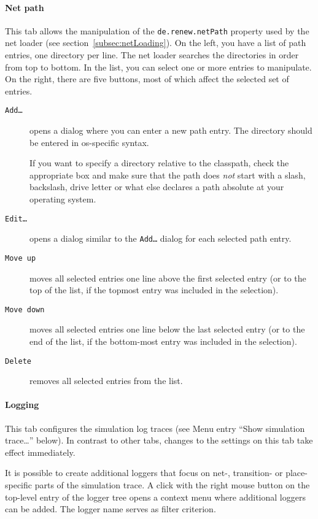 \paragraph{Net path}
This tab allows the manipulation of the \texttt{de.renew.netPath}
property used by the net loader (see
section~\ref{subsec:netLoading}).
On the left, you have a list of path entries, one directory per
line.
The net loader searches the directories in order from top to
bottom.
In the list, you can select one or more entries to manipulate.
On the right, there are five buttons, most of which affect the
selected set of entries.
\begin{description}
\item[\texttt{Add\dots}] opens a dialog where you can enter a new
  path entry.
  The directory should be entered in os-specific syntax.

  If you want to specify a directory relative to the classpath,
  check the appropriate box and make sure that the path does
  \emph{not} start with a slash, backslash, drive letter or what
  else declares a path absolute at your operating system.
\item[\texttt{Edit\dots}] opens a dialog similar to the
  \texttt{Add\dots} dialog for each selected path entry.
\item[\texttt{Move up}] moves all selected entries one line above
  the first selected entry (or to the top of the list, if the
  topmost entry was included in the selection).
\item[\texttt{Move down}] moves all selected entries one line below
  the last selected entry (or to the end of the list, if the
  bottom-most entry was included in the selection).
\item[\texttt{Delete}] removes all selected entries from the list.
\end{description}

\paragraph{Logging}
This tab configures the simulation log traces (see Menu entry ``Show
simulation trace\dots'' below). %
In contrast to other tabs, changes to the settings on this tab take effect
immediately.

It is possible to create additional loggers that focus on net-, transition-
or place-specific parts of the simulation trace.
A click with the right mouse button on the top-level entry of the logger
tree opens a context menu where additional loggers can be added.
The logger name serves as filter criterion.


